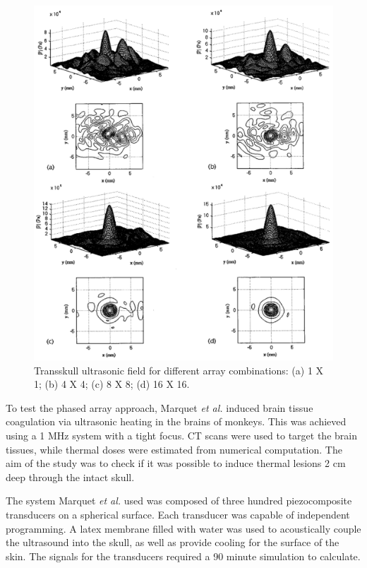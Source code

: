 \documentclass[letter,12pt,titlepage]{article}
\begin{document}
		\begin{figure}[h!]
			\centering
			\includegraphics[width=\textwidth]{./PNGs/Phased_Array.png}
			\caption{Transskull ultrasonic field for different array combinations: (a) 1 X 1; (b) 4 X 4; (c) 8 X 8; (d) 16 X 16. \cite{Sun_1998}}
			\label{fig:phased_array}
		\end{figure}
			
		To test the phased array approach, Marquet \textit{et al.} induced brain tissue coagulation via ultrasonic heating in the brains of monkeys. This was achieved using a 1 MHz system with a tight focus. CT scans were used to target the brain tissues, while thermal doses were estimated from numerical computation. The aim of the study was to check if it was possible to induce thermal lesions 2 cm deep through the intact skull. \cite{Marquet_2013}
		
		The system Marquet \textit{et al.} used was composed of three hundred piezocomposite transducers on a spherical surface. Each transducer was capable of independent programming. A latex membrane filled with water was used to acoustically couple the ultrasound into the skull, as well as provide cooling for the surface of the skin. The signals for the transducers required a 90 minute simulation to calculate. \cite{Marquet_2013}
		
\end{document}
